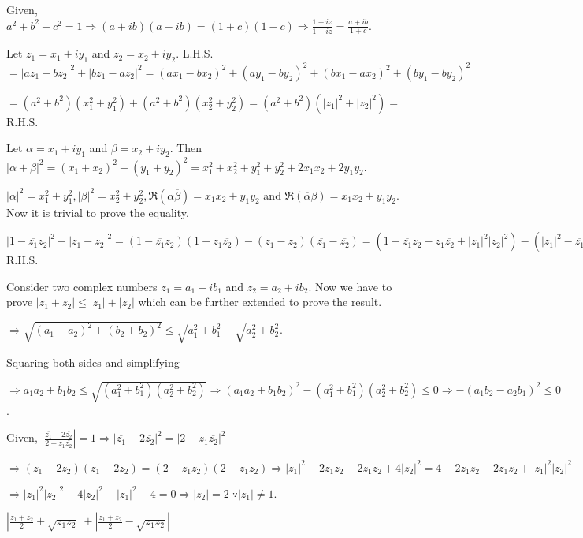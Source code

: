   Given, $a^2 + b^2 + c^2 = 1 \Rightarrow (a + ib)(a - ib) = (1 + c)(1 - c) \Rightarrow \frac{1 + iz}{1 -
    iz} = \frac{a + ib}{1 + c}$.
\item Let $z_1 = x_1 + iy_1$ and $z_2 = x_2 + iy_2$. L.H.S. $= |az_1 - bz_2|^2 + |bz_1 - az_2|^2 = (ax_1 -
  bx_2)^2 + (ay_1 - by_2)^2 + (bx_1 - ax_2)^2 + (by_1 - by_2)^2$

  $= (a^2 + b^2)(x_1^2 + y_1^2) + (a^2 + b^2)(x_2^2 + y_2^2) = (a^2 + b^2)(|z_1|^2 + |z_2|^2) =$ R.H.S.
\item Let $\alpha = x_1 + iy_1$ and $\beta = x_2 + iy_2$. Then $|\alpha + \beta|^2 = (x_1 + x_2)^2 + (y_1 +
  y_2)^2 = x_1^2 + x_2^2 + y_1^2 + y_2^2 + 2x_1x_2 + 2y_1y_2$.

  $|\alpha|^2 = x_1^2 + y_1^2, |\beta|^2 = x_2^2 + y_2^2, \Re(\alpha\overline{\beta}) = x_1x_2 + y_1y_2$ and
  $\Re(\overline{\alpha}\beta) = x_1x_2 + y_1y_2$. Now it is trivial to prove the equality.
\item $|1 - \overline{z_1}z_2|^2 - |z_1 - z_2|^2 = (1 - \overline{z_1}z_2)(1 - z_1\overline{z_2}) - (z_1 -
  z_2)(\overline{z_1} - \overline{z_2}) = (1 - \overline{z_1}z_2 - z_1\overline{z_2} + |z_1|^2|z_2|^2) -
  (|z_1|^2 - \overline{z_1}z_2 - z_1\overline{z_2} + |z_2|^2) = 1 - |z_1|^2 - |z_2|^2 + |z_1|^2|z_2|^2 = (1
  - |z_1|^2)(1 - |z_2|^2) =$ R.H.S.
\item Consider two complex numbers $z_1 = a_1 + ib_1$ and $z_2 = a_2 + ib_2.$ Now we have to prove $|z_1 +
  z_2| \le |z_1| + |z_2|$ which can be further extended to prove the result.

  $\Rightarrow \sqrt{(a_1 + a_2)^2 + (b_2 + b_2)^2} \le \sqrt{a_1^2 + b_1^2} + \sqrt{a_2^2 +
    b_2^2}$.

  Squaring both sides and simplifying

  $\Rightarrow a_1a_2 + b_1b_2 \le \sqrt{(a_1^2 + b_1^2)(a_2^2 + b_2^2)} \Rightarrow (a_1a_2 + b_1b_2)^2 -
  (a_1^2 + b_1^2)(a_2^2 + b_2^2) \le 0\Rightarrow -(a_1b_2 - a_2b_1)^2 \le 0$.
\item Given, $\left|\frac{\overline{z_1} - 2\overline{z_2}}{2 - z_1\overline{z_2}}\right| = 1\Rightarrow
  |\overline{z_1} - 2\overline{z_2}|^2 = |2 - z_1\overline{z_2}|^2$

  $\Rightarrow (\overline{z_1} - 2\overline{z_2})(z_1 - 2z_2) = (2 - z_1\overline{z_2})(2 -
  \overline{z_1}z_2) \Rightarrow |z_1|^2 - 2z_1\overline{z_2} - 2\overline{z_1}z_2 + 4|z_2|^2 = 4 -
  2z_1\overline{z_2} - 2\overline{z_1}z_2+ |z_1|^2|z_2|^2$

  $\Rightarrow |z_1|^2|z_2|^2 - 4|z_2|^2 - |z_1|^2 - 4 = 0 \Rightarrow |z_2| = 2\;\because |z_1|\neq 1$.
\item $\left|\frac{z_1 + z_2}{2} + \sqrt{z_1z_2}\right| + \left|\frac{z_1 + z_2}{2} - \sqrt{z_1z_2}\right|$

